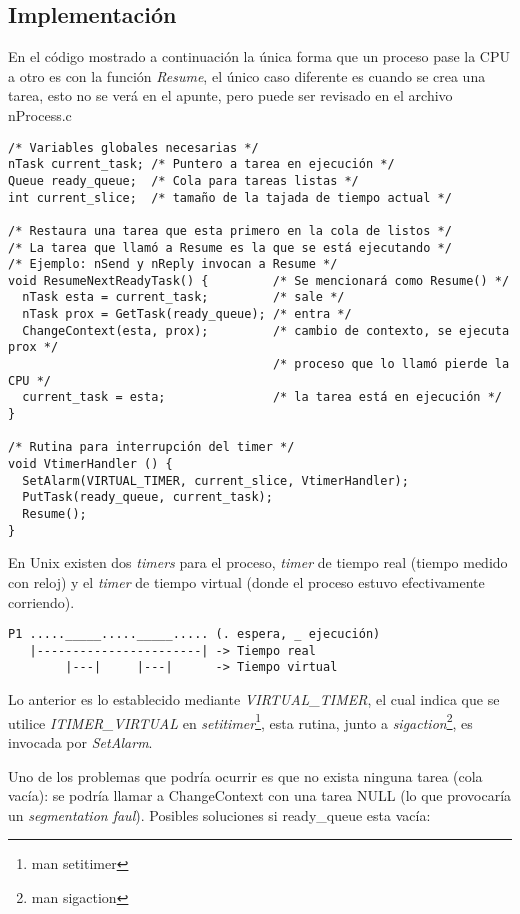 \subsection{Implementación}

En el código mostrado a continuación la única forma que un proceso pase la CPU a otro es con la función \textit{Resume}, el único caso diferente es cuando se crea una tarea, esto no se verá en el apunte, pero puede ser revisado en el archivo nProcess.c

\begin{verbatim}
/* Variables globales necesarias */
nTask current_task; /* Puntero a tarea en ejecución */
Queue ready_queue;  /* Cola para tareas listas */
int current_slice;  /* tamaño de la tajada de tiempo actual */

/* Restaura una tarea que esta primero en la cola de listos */
/* La tarea que llamó a Resume es la que se está ejecutando */
/* Ejemplo: nSend y nReply invocan a Resume */
void ResumeNextReadyTask() {         /* Se mencionará como Resume() */
  nTask esta = current_task;         /* sale */
  nTask prox = GetTask(ready_queue); /* entra */
  ChangeContext(esta, prox);         /* cambio de contexto, se ejecuta prox */
                                     /* proceso que lo llamó pierde la CPU */
  current_task = esta;               /* la tarea está en ejecución */
}

/* Rutina para interrupción del timer */
void VtimerHandler () {
  SetAlarm(VIRTUAL_TIMER, current_slice, VtimerHandler);
  PutTask(ready_queue, current_task);
  Resume();
}
\end{verbatim}

En Unix existen dos \textit{timers} para el proceso, \textit{timer} de tiempo real (tiempo medido con reloj) y el \textit{timer} de tiempo virtual (donde el proceso estuvo efectivamente corriendo).

\begin{verbatim}
P1 ....._____....._____..... (. espera, _ ejecución)
   |-----------------------| -> Tiempo real
        |---|     |---|      -> Tiempo virtual
\end{verbatim}

Lo anterior es lo establecido mediante \textit{VIRTUAL\_TIMER}, el cual indica que se utilice \textit{ITIMER\_VIRTUAL} en \textit{setitimer}\footnote{man setitimer}, esta rutina, junto a \textit{sigaction}\footnote{man sigaction}, es invocada por \textit{SetAlarm}.


Uno de los problemas que podría ocurrir es que no exista ninguna tarea (cola vacía): se podría llamar a ChangeContext con una tarea NULL (lo que provocaría un \textit{segmentation faul}). Posibles soluciones si ready\_queue esta vacía:

